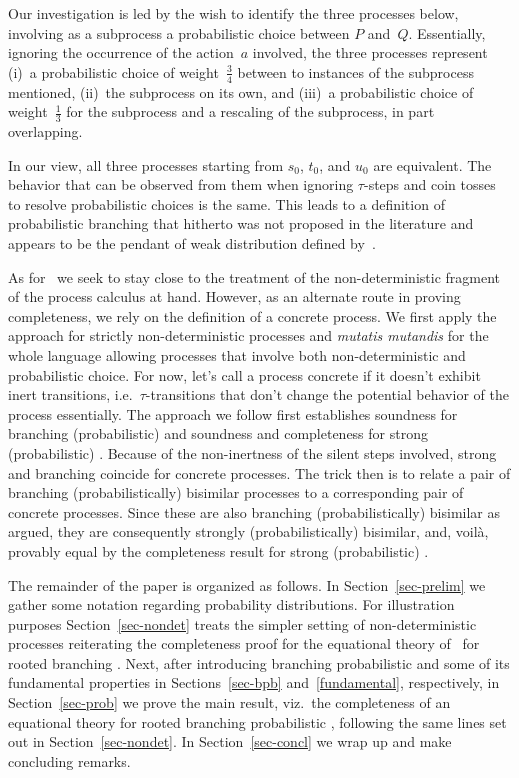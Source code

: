 Our investigation is led by the wish to identify the three processes
below, involving as a subprocess a probabilistic choice between $P$
and~$Q$. Essentially, ignoring the occurrence of the action~$a$
involved, the three processes represent (i)~a probabilistic choice of
weight~$\frac34$ between to instances of the subprocess mentioned,
(ii)~the subprocess on its own, and (iii)~a probabilistic choice of
weight~$\frac13$ for the subprocess and a rescaling of the subprocess,
in part overlapping.

\medskip

\scalebox{0.95}{%
\!\!\!\!\!%
}%

\medskip

\noindent
In our view, all three processes starting from $s_0$, $t_0$, and $u_0$
are equivalent. The behavior that can be observed from them when
ignoring $\tau$-steps and coin tosses to resolve probabilistic choices
is the same. This leads to a definition of probabilistic branching
{\bisimilarity} that hitherto was not proposed in the literature and
appears to be the pendant of weak distribution {\bisimilarity} defined
by~\cite{EHKTZ13:qest}.

As for~\cite{DP07:tcs} we seek to stay close to the treatment of the
non-deterministic fragment of the process calculus at hand. However,
as an alternate route in proving completeness, we rely on the
definition of a concrete process.  We first apply the approach for
strictly non-deterministic processes and \emph{mutatis mutandis} for
the whole language allowing processes that involve both
non-deterministic and probabilistic choice. For now, let's call a
process concrete if it doesn't exhibit inert transitions,
i.e.\ $\tau$-transitions that don't change the potential behavior of
the process essentially. The approach we follow first establishes
soundness for branching (probabilistic) {\bisimilarity} and soundness and
completeness for strong (probabilistic) {\bisimilarity}. Because of the
non-inertness of the silent steps involved, strong and branching
{\bisimilarity} coincide for concrete processes. The trick then is to
relate a pair of branching (probabilistically) bisimilar processes to
a corresponding pair of concrete processes. Since these are also
branching (probabilistically) bisimilar as argued, they are
consequently strongly (probabilistically) bisimilar, and, voil\`a,
provably equal by the completeness result for strong (probabilistic)
{\bisimilarity}.

The remainder of the paper is organized as follows. In
Section~\ref{sec-prelim} we gather some notation regarding probability
distributions. For illustration purposes Section~\ref{sec-nondet}
treats the simpler setting of non-deterministic processes reiterating
the completeness proof for the equational theory of~\cite{GW96:jacm}
for rooted branching {\bisimilarity}. Next, after introducing
branching probabilistic {\bisimilarity} and some of its fundamental
properties in Sections~\ref{sec-bpb} and~\ref{fundamental},
respectively, in Section~\ref{sec-prob} we prove the main result,
viz.\ the completeness of an equational theory for rooted branching
probabilistic {\bisimilarity}, following the same lines set out in
Section~\ref{sec-nondet}. In Section~\ref{sec-concl} we wrap up and
make concluding remarks.

